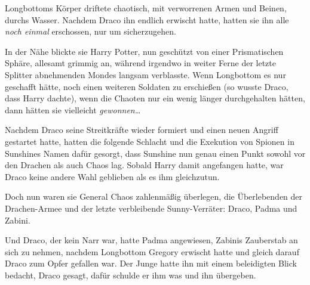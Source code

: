 Longbottoms Körper driftete chaotisch, mit verworrenen Armen und Beinen, durchs Wasser. Nachdem Draco ihn endlich erwischt hatte, hatten sie ihn alle \emph{noch einmal} erschossen, nur um sicherzugehen.

In der Nähe blickte sie Harry Potter, nun geschützt von einer Prismatischen Sphäre, allesamt grimmig an, während irgendwo in weiter Ferne der letzte Splitter abnehmenden Mondes langsam verblasste. Wenn Longbottom es nur geschafft hätte, noch einen weiteren Soldaten zu erschießen (so wusste Draco, dass Harry dachte), wenn die Chaoten nur ein wenig länger durchgehalten hätten, dann hätten sie vielleicht \emph{gewonnen…}

Nachdem Draco seine Streitkräfte wieder formiert und einen neuen Angriff gestartet hatte, hatten die folgende Schlacht und die Exekution von Spionen in Sunshines Namen dafür gesorgt, dass Sunshine nun genau einen Punkt sowohl vor den Drachen als auch Chaos lag. Sobald Harry damit angefangen hatte, war Draco keine andere Wahl geblieben als es ihm gleichzutun.

Doch nun waren sie General Chaos zahlenmäßig überlegen, die Überlebenden der Drachen-Armee und der letzte verbleibende Sunny-Verräter: Draco, Padma und Zabini.

Und Draco, der kein Narr war, hatte Padma angewiesen, Zabinis Zauberstab an sich zu nehmen, nachdem Longbottom Gregory erwischt hatte und gleich darauf Draco zum Opfer gefallen war. Der Junge hatte ihn mit einem beleidigten Blick bedacht, Draco gesagt, dafür schulde er ihm was und ihn übergeben.

